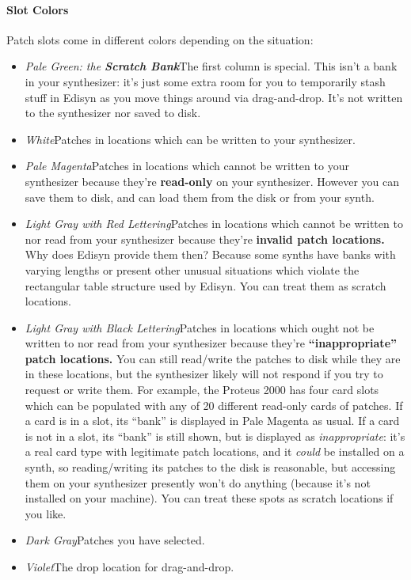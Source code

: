 \documentclass{article}
\begin{document}
\paragraph{Slot Colors} 

Patch slots come in different colors depending on the situation:

\begin{itemize}
\item {\it Pale Green: the \textbf{Scratch Bank}}\quad The first column is special.  This isn't a bank in your synthesizer: it's just some extra room for you to temporarily stash stuff in Edisyn as you move things around via drag-and-drop.  It's not written to the synthesizer nor saved to disk.
\item {\it White}\quad Patches in locations which can be written to your synthesizer.
\item {\it Pale Magenta}\quad Patches in locations which cannot be written to your synthesizer because they're {\bf read-only} on your synthesizer.  However you can save them to disk, and can load them from the disk or from your synth.
\item {\it Light Gray with Red Lettering}\quad Patches in locations which cannot be written to nor read from your synthesizer because they're {\bf invalid patch locations.}  Why does Edisyn provide them then?  Because some synths have banks with varying lengths or present other unusual situations which violate the rectangular table structure used by Edisyn.  You can treat them as scratch locations.
\item {\it Light Gray with Black Lettering}\quad Patches in locations which ought not be written to nor read from your synthesizer because they're {\bf ``inappropriate'' patch locations.}  You can still read/write the patches to disk while they are in these locations, but the synthesizer likely will not respond if you try to request or write them.  For example, the Proteus 2000 has four card slots which can be populated with any of 20 different read-only cards of patches.  If a card is in a slot, its ``bank'' is displayed in Pale Magenta as usual.  If a card is not in a slot, its ``bank'' is still shown, but is displayed as {\it inappropriate}: it's a real card type with legitimate patch locations, and it {\it could} be installed on a synth, so reading/writing its patches to the disk is reasonable, but accessing them on your synthesizer presently won't do anything (because it's not installed on your machine).  You can treat these spots as scratch locations if you like.
\item {\it Dark Gray}\quad Patches you have selected.
\item {\it Violet}\quad The drop location for drag-and-drop.
\end{itemize}
\end{document}
